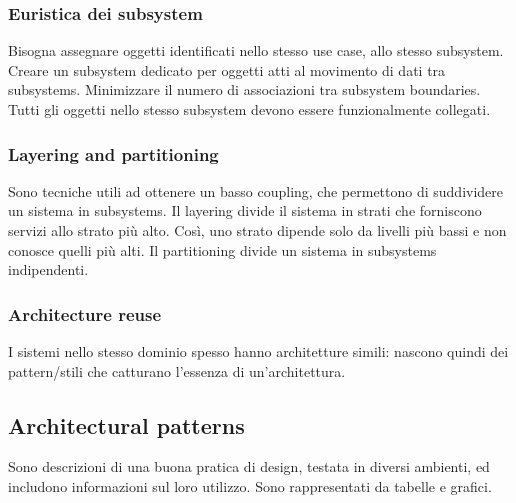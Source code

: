 \documentclass[11pt]{article}
\begin{document}
\subsubsection{Euristica dei subsystem}
Bisogna assegnare oggetti identificati nello stesso use case, allo stesso subsystem. Creare un subsystem dedicato per oggetti atti al movimento di dati tra subsystems. Minimizzare il numero di associazioni tra subsystem boundaries. Tutti gli oggetti nello stesso subsystem devono essere funzionalmente collegati. 
\subsubsection{Layering and partitioning}
Sono tecniche utili ad ottenere un basso coupling, che permettono di suddividere un sistema in subsystems. Il layering divide il sistema in strati che forniscono servizi allo strato più alto. Così, uno strato dipende solo da livelli più bassi e non conosce quelli più alti. Il partitioning divide un sistema in subsystems indipendenti. 
\subsubsection{Architecture reuse}
I sistemi nello stesso dominio spesso hanno architetture simili: nascono quindi dei pattern/stili che catturano l'essenza di un'architettura.
\subsection{Architectural patterns}
Sono descrizioni di una buona pratica di design, testata in diversi ambienti, ed includono informazioni sul loro utilizzo. Sono rappresentati da tabelle e grafici.
\end{document}
